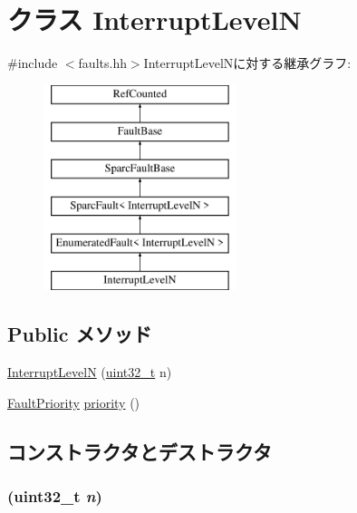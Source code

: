\hypertarget{classSparcISA_1_1InterruptLevelN}{
\section{クラス InterruptLevelN}
\label{classSparcISA_1_1InterruptLevelN}
}


{\ttfamily \#include $<$faults.hh$>$}InterruptLevelNに対する継承グラフ:\begin{figure}[H]
\begin{center}
\leavevmode
\includegraphics[height=6cm]{classSparcISA_1_1InterruptLevelN}
\end{center}
\end{figure}
\subsection*{Public メソッド}
\begin{DoxyCompactItemize}
\item 
\hyperlink{classSparcISA_1_1InterruptLevelN_a5a6b27df476f9406d75bf4ba56df9334}{InterruptLevelN} (\hyperlink{Type_8hh_a435d1572bf3f880d55459d9805097f62}{uint32\_\-t} n)
\item 
\hyperlink{namespaceSparcISA_ab4ef46911de05ddf45ea58ee440ff324}{FaultPriority} \hyperlink{classSparcISA_1_1InterruptLevelN_a57b9ac2b92afbf2567e6d7b131900712}{priority} ()
\end{DoxyCompactItemize}


\subsection{コンストラクタとデストラクタ}
\hypertarget{classSparcISA_1_1InterruptLevelN_a5a6b27df476f9406d75bf4ba56df9334}{
\subsubsection[{InterruptLevelN}]{ ({\bf uint32\_\-t} {\em n})}}
\label{classSparcISA_1_1InterruptLevelN_a5a6b27df476f9406d75bf4ba56df9334}



